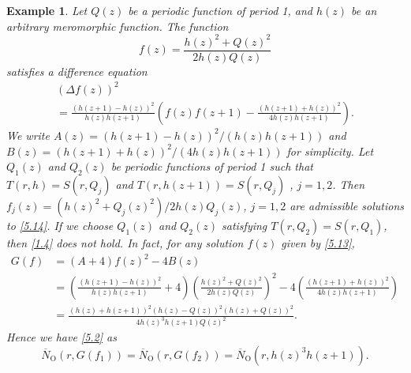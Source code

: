 \documentclass{amsart}
\newtheorem{example}[theorem]{Example}
\begin{document}
\begin{example}\label{ex5.1} Let $Q(z)$ be a periodic function of period 1, and $h(z)$ be an
arbitrary meromorphic function.
The function
\begin{equation}
f(z)=\frac{h(z)^2+Q(z)^2}{2h(z)Q(z)}\label{5.13}
\end{equation}
satisfies a difference equation
\begin{multline}
(\Delta f(z))^2\\
=\frac{(h(z+1)-h(z))^2}{h(z)h(z+1)}\left(f(z)f(z+1)-\frac{(h(z+1)+h(z))^2}{4h(z)h(z+1)}\right).\label{5.14}
\end{multline}
We write $A(z)=(h(z+1)-h(z))^2/(h(z)h(z+1))$ and $B(z)=(h(z+1)+h(z))^2/(4h(z)h(z+1))$ for simplicity. Let $Q_1(z)$ and $Q_2(z)$ be periodic functions of period 1 such that
$T(r,h)=S(r,Q_j)$ and $T(r,h(z+1))=S(r,Q_j)$ , $j=1, 2$. Then $f_j(z)=(h(z)^2+Q_j(z)^2)/2h(z)Q_j(z)$, $j=1, 2$ are admissible solutions to \eqref{5.14}. If we choose $Q_1(z)$ and $Q_2(z)$ satisfying $T(r,Q_2)=S(r,Q_1)$, then \eqref{1.4} does not hold. In fact, for any solution $f(z)$ given by \eqref{5.13},
\begin{align*}
G(f)&=(A+4)f(z)^2-4B(z)\\
&=\left(\frac{(h(z+1)-h(z))^2}{h(z)h(z+1)}+4\right)\left(\frac{h(z)^2+Q(z)^2}{2h(z)Q(z)}\right)^2-4\left(\frac{(h(z+1)+h(z))^2}{4h(z)h(z+1)}\right)\\
&=\frac{(h(z)+h(z+1))^2(h(z)-Q(z))^2(h(z)+Q(z))^2}{4h(z)^3h(z+1)Q(z)^2}.
\end{align*}
Hence we have \eqref{5.2} as
\begin{equation*}
\overline N_{\text{O}}(r,G(f_1))=\overline N_{\text{O}}(r,G(f_2))=\overline N_{\text{O}}(r,h(z)^3h(z+1)).
\end{equation*}
\end{example}







%
%

\def\cprime{$'$}
\providecommand{\bysame}{\leavevmode\hbox to3em{\hrulefill}\thinspace}
\providecommand{\MR}{\relax\ifhmode\unskip\space\fi MR }
\providecommand{\MRhref}[2]{%
  \href{http://www.ams.org/mathscinet-getitem?mr=#1}{#2}
}
\providecommand{\href}[2]{#2}




\vspace{0.5cm}
\end{document}
